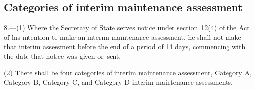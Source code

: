 \documentclass[a4paper,12pt]{article}
\begin{document}
%
%
%

\subsection[8. Categories of interim maintenance assessment]{Categories of interim maintenance assessment}

8.—(1) Where 
the Secretary of State  %
serves notice under section~12(4) of the Act of his intention to make an interim maintenance assessment, he shall not make that interim assessment before the end of a period of 14 days, commencing with the date that notice was given or~sent.

(2) There shall be four categories of interim maintenance assessment, Category A, Category B, Category C, and Category D interim maintenance assessments.
\end{document}
